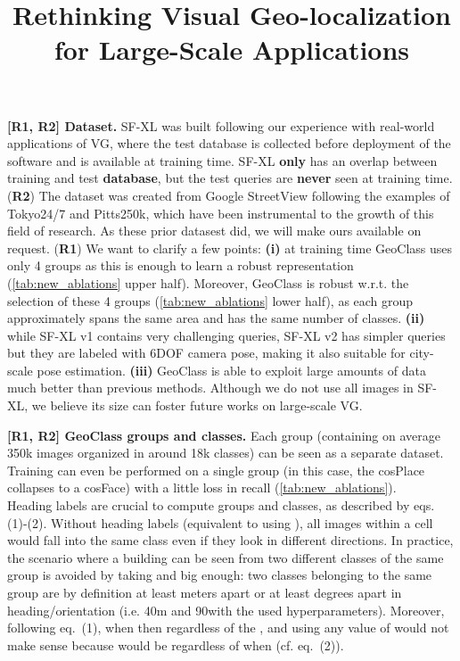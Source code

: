 \documentclass[10pt,twocolumn,letterpaper]{article}
\newcommand{\RI}{{\color{red}\textbf{R1}}}
\newcommand{\RII}{{\color{ForestGreen}\textbf{R2}}}
\newcommand{\myparagraph}[1]{\vspace{-0.5pt}\noindent\textbf{#1}}
\begin{document}
\title{Rethinking Visual Geo-localization for Large-Scale Applications}  

\maketitle
\thispagestyle{empty}
\appendix

\noindent






\myparagraph{[{\RI, \RII}] Dataset.} 
SF-XL was built following our experience with real-world applications of VG, where the test database is collected before deployment of the software and is available at training time. SF-XL \textbf{only} has an overlap between training and test \textbf{database}, but the test queries are \textbf{never} seen at training time.
({\RII}) The dataset was created from Google StreetView following the examples of Tokyo24/7 and Pitts250k, which have been instrumental to the growth of this field of research. As these prior datasest did, we will make ours available on request.
({\RI}) We want to clarify a few points:
\textbf{(i)} at training time GeoClass uses only 4 groups as this is enough to learn a robust representation (\cref{tab:new_ablations} upper half).
Moreover, GeoClass is robust w.r.t. the selection of these 4 groups (\cref{tab:new_ablations} lower half), as each group approximately spans the same area and has the same number of classes.
\textbf{(ii)} while SF-XL v1 contains very challenging queries, SF-XL v2 has simpler queries but they are labeled with 6DOF camera pose, making it also suitable for city-scale pose estimation.
\textbf{(iii)} GeoClass is able to exploit large amounts of data much better than previous methods. Although we do not use all images in SF-XL, we believe its size can foster future works on large-scale VG. 







\myparagraph{[{\RI, \RII}] GeoClass groups and classes.} 
Each group (containing on average 350k images organized in around 18k classes) can be seen as a separate dataset. Training can even be performed on a single group (in this case, the cosPlace collapses to a cosFace) with a little loss in recall (\cref{tab:new_ablations}). \\
Heading labels are crucial to compute groups and classes, as described by eqs. (1)-(2).
Without heading labels (equivalent to using ), all images within a cell would fall into the same class even if they look in different directions.
In practice, the scenario where a building can be seen from two different classes of the same group is avoided by taking  and  big enough: two classes belonging to the same group are by definition at least  meters apart or at least  degrees apart in heading/orientation (i.e. 40m and 90\degree with the used hyperparameters).
Moreover, following eq.~(1), when  then  regardless of the , and using any value of  would not make sense because  would be  regardless of  when  (cf. eq.~(2)).
\end{document}
